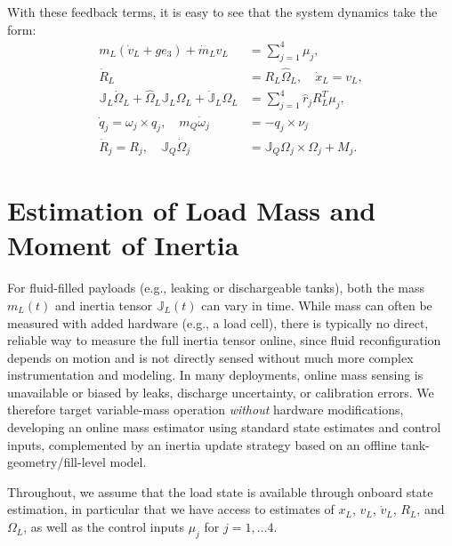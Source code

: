 \documentclass[letterpaper, 10 pt, conference]{ieeeconf}  %
\newcounter{part} %
\newcommand{\J}{\mathbb{J}}
\newcommand{\todo}[1]{
  \vspace{5mm}\par \noindent
  \marginpar{\textsc{ToDo}}
  \framebox{
    \begin{minipage}[c]{0.95\linewidth}
      \tt #1
    \end{minipage}
  }
  \vspace{5mm}\par
}
\begin{document}
With these feedback terms, it is easy to see that the system dynamics take the form:
\begin{align}
    m_L(\dot{v}_L + ge_3) + \dot{m}_L v_L &= \sum_{j=1}^4 \mu_j, \label{xdynred2}\\
    \dot{R}_L &= R_L \hat{\Omega}_L, \quad \dot{x}_L = v_L,  \label{RLkinred2}\\
    \mathbb{J}_L \dot{\Omega}_L + \hat{\Omega}_L \mathbb{J}_L \Omega_L + \dot{\mathbb{J}}_L \Omega_L &= \sum_{j=1}^4 \hat{r}_j R_L^T \mu_j, \label{RLdynred2}\\
  \dot{q}_j = \omega_j \times q_j,\quad   m_Q \dot{\omega}_j &= -q_j \times \nu_j
    \label{qdynred2}\\
  \dot{R}_j = R_j, \quad  \mathbb{J}_Q \dot{\Omega}_j &= \mathbb{J}_Q \Omega_j \times \Omega_j + M_j. \label{Rjdynred2}
\end{align}


\section{Estimation of Load Mass and Moment of Inertia}
For fluid-filled payloads (e.g., leaking or dischargeable tanks), both the mass $m_L(t)$ and inertia tensor $\J_L(t)$ can vary in time. While mass can often be measured with added hardware (e.g., a load cell), there is typically no direct, reliable way to measure the full inertia tensor online, since fluid reconfiguration depends on motion and is not directly sensed without much more complex instrumentation and modeling. In many deployments, online mass sensing is unavailable or biased by leaks, discharge uncertainty, or calibration errors. We therefore target variable-mass operation \emph{without} hardware modifications, developing an online mass estimator using standard state estimates and control inputs, complemented by an inertia update strategy based on an offline tank-geometry/fill-level model.

Throughout, we assume that the load state is available through onboard state estimation, in particular that we have access to estimates of
$x_L$, $v_L$, $\dot v_L$, $R_L$, and $\Omega_L$, as well as the control inputs $\mu_j$ for $j=1,\dots 4$.


\end{document}
